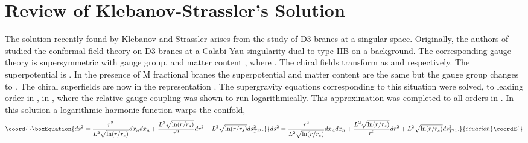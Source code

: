 \documentclass[12pt,epsf,a4paper]{article}
\begin{document}


\section {Review of Klebanov-Strassler's Solution}{\label{review}} 

The solution recently found by Klebanov and Strassler arises from the 
study of D3-branes at a singular space. Originally, 
the authors of \cite{KW1} studied the conformal field theory on D3-branes at a Calabi-Yau 
singularity dual to type IIB on a \coordHE{} background. The corresponding 
gauge theory is 
\coordHE{} supersymmetric with  \coordHE{} 
gauge group, and matter content \coordHE{},\coordHE{} where \coordHE{}. The chiral fields 
transform as \coordHE{} and  \coordHE{} respectively. 
The superpotential is \coordHE{} . 
In the presence of M fractional branes the superpotential and matter
content are the same but the gauge group changes to \coordHE{}. The chiral
superfields are  now in the representation \coordHE{}. The supergravity 
equations corresponding to this situation were solved, to leading 
order in \coordHE{}, in \cite{KN}, where the relative gauge coupling \coordHE{} was 
shown to run logarithmically. This approximation was completed to all orders in \cite{KT}. 
In this solution  a logarithmic harmonic function warps the conifold,
\begin{equation}\coord{}\boxEquation{
ds^2 = \frac {r^2}{L^2 \sqrt{\ln (r/r_s)}} dx_n dx_n + \frac {L^2 \sqrt{ \ln (r/r_s)}}{r^2} 
dr^2 + L^2 \sqrt{ \ln (r/r_s)} ds^2_{T^{11}}.
\label{1}
}{
ds^2 = \frac {r^2}{L^2 \sqrt{\ln (r/r_s)}} dx_n dx_n + \frac {L^2 \sqrt{ \ln (r/r_s)}}{r^2} 
dr^2 + L^2 \sqrt{ \ln (r/r_s)} ds^2_{T^{11}}.
}{ecuacion}\coordE{}\end{equation}
  
\end{document}
